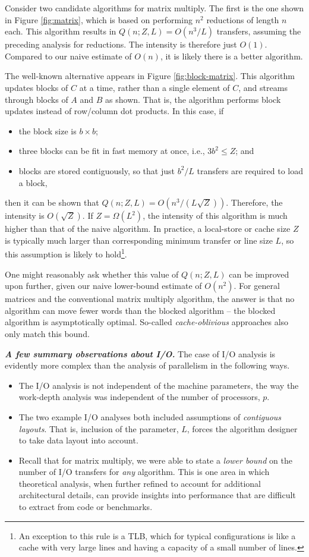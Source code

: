 \documentclass[twocolumn]{article}
\newcommand{\bi}{\begin{itemize}}
\newcommand{\ei}{\end{itemize}}
\newcommand{\ii}{\item}
\begin{document}
Consider two candidate algorithms for matrix multiply. The first is the one shown in Figure \ref{fig:matrix}, which is based on performing $n^2$ reductions of length $n$ each. This algorithm results in $Q(n; Z, L) = O(n^3/L)$ transfers, assuming the preceding analysis for reductions. The intensity is therefore just $O(1)$. 
Compared to our naive estimate of $O(n)$, it is likely there is a better algorithm.

The well-known alternative appears in Figure \ref{fig:block-matrix}. 
This algorithm updates blocks of $C$ at a time, rather than a single element of $C$, 
and streams through blocks of $A$ and $B$ as shown. 
That is, the algorithm performs block updates instead of row/column dot products. In this case, if
\bi
\ii the block size is $b \times b$;
\ii three blocks can be fit in fast memory at once, i.e., $3b^2 \leq Z$; and
\ii blocks are stored contiguously, so that just $b^2/L$ transfers are required to load a block,
\ei
then it can be shown that $Q(n; Z, L) = O(n^3/(L \sqrt{Z}))$.
Therefore, the intensity is $O(\sqrt{Z})$.
If $Z=\Omega(L^2)$, the intensity of this algorithm is much higher than that of the naive algorithm. In practice, a local-store or cache size $Z$ is typically much larger than corresponding minimum transfer or line size $L$, so this assumption is likely to hold\footnote{An exception to this rule is a TLB, which for typical configurations is like a cache with very large lines and having a capacity of a small number of lines.}.

One might reasonably ask whether this value of $Q(n; Z, L)$ can be improved upon further, given our naive lower-bound estimate of $O(n^2)$.
For general matrices and the conventional matrix multiply algorithm, the answer is that no algorithm can move fewer words than the blocked algorithm -- the blocked algorithm is asymptotically optimal.
So-called \textit{cache-oblivious} approaches also only match this bound.

\noindent
\textit{\textbf{A few summary observations about I/O.}} 
The case of I/O analysis is evidently more complex than the analysis of parallelism in the following ways.
\bi
\ii The I/O analysis is not independent of the machine parameters, the way the work-depth analysis was independent of the number of processors, $p$.
\ii The two example I/O analyses both included assumptions of \textit{contiguous layouts}. 
That is, inclusion of the parameter, $L$, forces the algorithm designer to take data layout into account.
\ii Recall that for matrix multiply, we were able to state a \textit{lower bound} on the number of I/O transfers for \textit{any} algorithm. This is one area in which theoretical analysis, when further refined to account for additional architectural details, can provide insights into performance that are difficult to extract from code or benchmarks.
\ei
\end{document}

